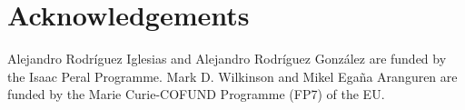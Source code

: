 \documentclass[sw]{iosart2c}
\begin{document}
\section*{Acknowledgements}
Alejandro Rodr\'iguez Iglesias and Alejandro Rodr\'iguez Gonz\'alez are funded by the Isaac Peral Programme. Mark D. Wilkinson and Mikel Ega\~na Aranguren are funded by the Marie Curie-COFUND Programme (FP7) of the EU.











  
\end{document}
